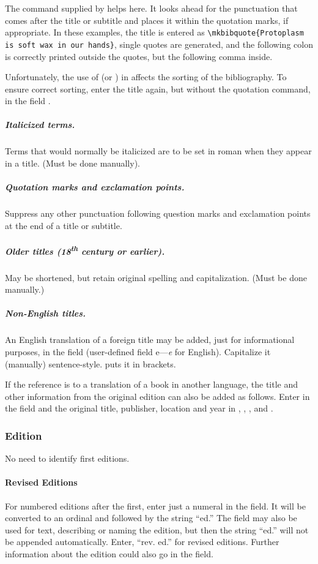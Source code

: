 \documentclass{ltxdockit}[2010/02/12]
\begin{document}
The  command supplied by  helps here. It looks ahead for the punctuation that comes after the title or subtitle and places it within the quotation marks, if appropriate. In these examples, the title is entered as \verb|\mkbibquote{Protoplasm is soft wax in our hands}|, single quotes are generated, and the following colon is correctly printed outside the quotes, but the following comma inside.\autocites[][]{gliboff2005protoplasm, gliboff2005protoplasm-no-sub}

Unfortunately, the use of  (or ) in  affects the sorting of the bibliography. To ensure correct sorting, enter the title again, but without the quotation command, in the field .

\subparagraph{Italicized terms.} Terms that would normally be italicized are to be set in roman when they appear in a title. (Must be done manually).
\subparagraph{Quotation marks and exclamation points.}
Suppress any other punctuation following question marks and exclamation points at the end of a title or subtitle.\autocites[][]{crick1988what-mad,crick1988what-madsubtitle}
\subparagraph{Older titles (18\textsuperscript{th} century or earlier).} May be shortened, but retain original spelling and capitalization. (Must be done manually.)
\subparagraph{Non-English titles.}
An English translation of a foreign title may be added, just for informational purposes, in the field  (\ie user-defined field e---\emph{e} for English). Capitalize it (manually) sentence-style.  puts it in brackets.\autocites[][]{343} 

If the reference is to a translation of a book in another language, the title and other information from the original edition can also be added as follows. Enter  in the  field and the original title, publisher, location and year in , , , and .\autocites{2824}

\subsubsection{Edition}
No need to identify first editions.
\paragraph{Revised Editions}
For numbered editions after the first, enter just a numeral in the  field. It will be converted to an ordinal and followed by the string ``ed.''\autocites[][]{olby1985origins-of-mend2}
The  field may also be used for text, describing or naming the edition, but then the string ``ed.'' will not be appended automatically. Enter, \eg ``rev. ed.'' for revised editions.\autocites[][]{1240} Further information about the edition could also go in the  field.
\end{document}
